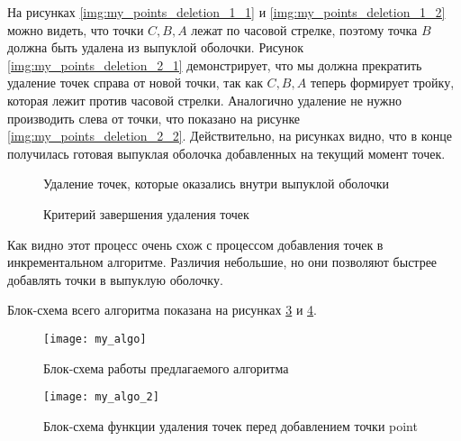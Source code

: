 На рисунках \ref{img:my_points_deletion_1_1} и \ref{img:my_points_deletion_1_2} можно видеть, что точки $C, B, A$ лежат по часовой стрелке, поэтому точка $B$ должна быть удалена из выпуклой оболочки. Рисунок \ref{img:my_points_deletion_2_1} демонстрирует, что мы должна прекратить удаление точек справа от новой точки, так как $C, B, A$ теперь формирует тройку, которая лежит против часовой стрелки. Аналогично удаление не нужно производить слева от точки, что показано на рисунке \ref{img:my_points_deletion_2_2}. Действительно, на рисунках видно, что в конце получилась готовая выпуклая оболочка добавленных на текущий момент точек.

\begin{figure}[H]
	{\centering
		\hfill
		\subbottom[\label{img:my_points_deletion_1_1}]{%
			}
		\hfill
		\subbottom[\label{img:my_points_deletion_1_2}]{%
			}
		\hfill
	}
	\caption{Удаление точек, которые оказались внутри выпуклой оболочки}
	\label{img:my_points_deletion_1}
\end{figure}

\begin{figure}[H]
	{\centering
		\hfill
		\subbottom[\label{img:my_points_deletion_2_1}]{%
			}
		\hfill
		\subbottom[\label{img:my_points_deletion_2_2}]{%
			}
		\hfill
	}
	\caption{Критерий завершения удаления точек}
	\label{img:my_points_deletion_2}
\end{figure}

Как видно этот процесс очень схож с процессом добавления точек в инкрементальном алгоритме. Различия небольшие, но они позволяют быстрее добавлять точки в выпуклую оболочку.

Блок-схема всего алгоритма показана на рисунках \ref{img:my_algo} и \ref{img:my_algo_deletion}.

\begin{figure}[H]
	\centering
	\texttt{[image: my\_algo]}
	\caption{Блок-схема работы предлагаемого алгоритма}
	\label{img:my_algo}
\end{figure}

\begin{figure}[H]
	\centering
	\texttt{[image: my\_algo\_2]}
	\caption{Блок-схема функции удаления точек перед добавлением точки point}
	\label{img:my_algo_deletion}
\end{figure}

